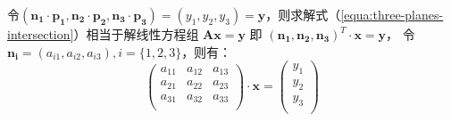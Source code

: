 令$(\bm{n_1} \cdot \bm{p_1}, \bm{n_2} \cdot \bm{p_2}, \bm{n_3} \cdot \bm{p_3})
= (y_1, y_2, y_3) = \bm{y}$，则求解式（\ref{equa:three-planes-intersection}）相当于解线性方程组
$\bm{A} \bm{x}=\bm{y}$ 即 $(\bm{n_1},\bm{n_2}, \bm{n_3})^T \cdot \bm{x} = \bm{y}$， 令
$\bm{n_i} = (a_{i1}, a_{i2}, a_{i3}), i=\{1,2,3\}$，则有：
\begin{equation*}
  \label{equa:matrix:crammer}
  \left(
    \begin{array}{ccc}
      a_{11} & a_{12} & a_{13} \\
      a_{21} & a_{22} & a_{23} \\
      a_{31} & a_{32} & a_{33} \\
    \end{array}
  \right)
  \cdot 
  \bm{x} 
  =
  \left(
    \begin{array}{c}
      y_{1} \\
      y_{2} \\
      y_{3} \\
    \end{array}
  \right)
\end{equation*}

